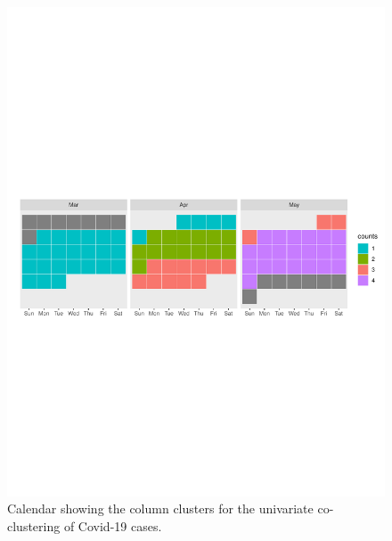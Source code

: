 \documentclass[12pt,a4paper]{article}
\begin{document}
\begin{figure}[H]
	\begin{center}
		\includegraphics[width=\columnwidth]{Deaths_calendar.pdf}
		\caption{Calendar showing the column clusters for the univariate co-clustering of Covid-19 cases.}
		
	\end{center}
\end{figure}
\end{document}
